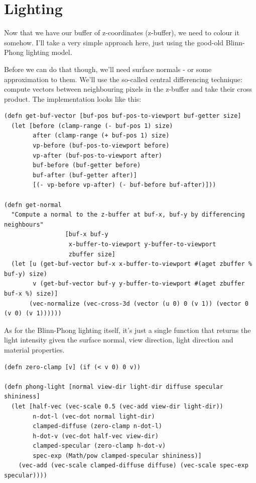 \documentclass[11pt]{article}
\begin{document}
\section{Lighting}

Now that we have our buffer of z-coordinates (z-buffer), we need to colour it somehow. I'll take a very simple approach here, just using the good-old Blinn-Phong lighting model.

Before we can do that though, we'll need surface normals - or some approximation to them. We'll use the so-called central differencing technique: compute vectors between neighbouring pixels in the z-buffer and take their cross product. The implementation looks like this:

\begin{lstlisting}
(defn get-buf-vector [buf-pos buf-pos-to-viewport buf-getter size]
  (let [before (clamp-range (- buf-pos 1) size)
        after (clamp-range (+ buf-pos 1) size)
        vp-before (buf-pos-to-viewport before)
        vp-after (buf-pos-to-viewport after)
        buf-before (buf-getter before)
        buf-after (buf-getter after)]    
        [(- vp-before vp-after) (- buf-before buf-after)]))

(defn get-normal 
  "Compute a normal to the z-buffer at buf-x, buf-y by differencing neighbours"
                 [buf-x buf-y 
                  x-buffer-to-viewport y-buffer-to-viewport 
                  zbuffer size]
  (let [u (get-buf-vector buf-x x-buffer-to-viewport #(aget zbuffer % buf-y) size)
        v (get-buf-vector buf-y y-buffer-to-viewport #(aget zbuffer buf-x %) size)]
       (vec-normalize (vec-cross-3d (vector (u 0) 0 (v 1)) (vector 0 (v 0) (v 1))))))
\end{lstlisting}

As for the Blinn-Phong lighting itself, it's just a single function that returns the light intensity given the surface normal, view direction, light direction and material properties. 

\begin{lstlisting}
(defn zero-clamp [v] (if (< v 0) 0 v))   
  
(defn phong-light [normal view-dir light-dir diffuse specular shininess]
  (let [half-vec (vec-scale 0.5 (vec-add view-dir light-dir))
        n-dot-l (vec-dot normal light-dir)
        clamped-diffuse (zero-clamp n-dot-l)
        h-dot-v (vec-dot half-vec view-dir)
        clamped-specular (zero-clamp h-dot-v)
        spec-exp (Math/pow clamped-specular shininess)]
    (vec-add (vec-scale clamped-diffuse diffuse) (vec-scale spec-exp specular))))
\end{lstlisting}
\end{document}
